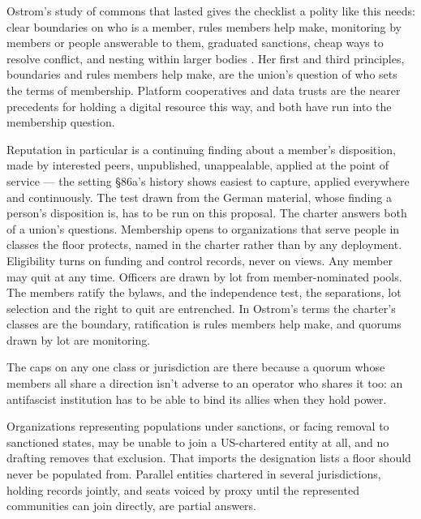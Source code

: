 Ostrom's study of commons that lasted gives the checklist a polity like this needs: clear boundaries on who is a member, rules members help make, monitoring by members or people answerable to them, graduated sanctions, cheap ways to resolve conflict, and nesting within larger bodies \autocite{ostrom1990governing}. Her first and third principles, boundaries and rules members help make, are the union's question of who sets the terms of membership. Platform cooperatives and data trusts are the nearer precedents for holding a digital resource this way, and both have run into the membership question.

Reputation in particular is a continuing finding about a member's disposition, made by interested peers, unpublished, unappealable, applied at the point of service — the setting \S86a's history shows easiest to capture, applied everywhere and continuously. The test drawn from the German material, whose finding a person's disposition is, has to be run on this proposal. The charter answers both of a union's questions. Membership opens to organizations that serve people in classes the floor protects, named in the charter rather than by any deployment. Eligibility turns on funding and control records, never on views. Any member may quit at any time. Officers are drawn by lot from member-nominated pools. The members ratify the bylaws, and the independence test, the separations, lot selection and the right to quit are entrenched. In Ostrom's terms the charter's classes are the boundary, ratification is rules members help make, and quorums drawn by lot are monitoring.

The caps on any one class or jurisdiction are there because a quorum whose members all share a direction isn't adverse to an operator who shares it too: an antifascist institution has to be able to bind its allies when they hold power.

Organizations representing populations under sanctions, or facing removal to sanctioned states, may be unable to join a US-chartered entity at all, and no drafting removes that exclusion. That imports the designation lists a floor should never be populated from. Parallel entities chartered in several jurisdictions, holding records jointly, and seats voiced by proxy until the represented communities can join directly, are partial answers.


